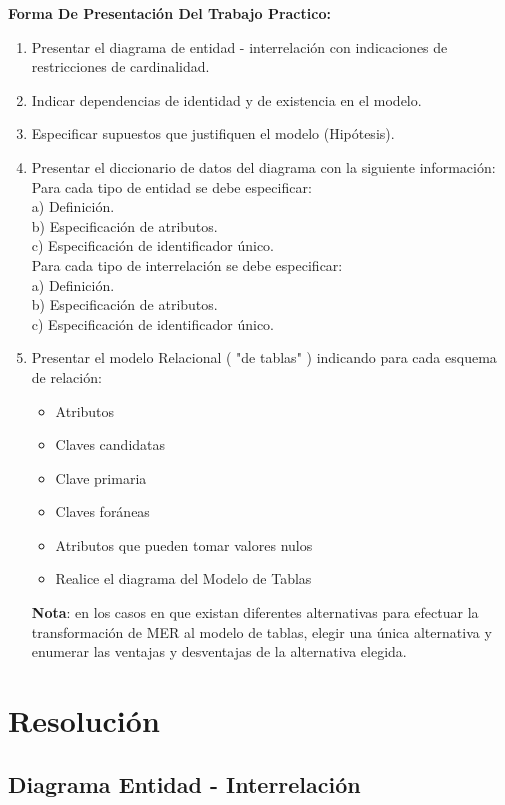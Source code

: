 \documentclass[a4paper,10pt,titlepage]{article}
\begin{document}
\textbf{Forma De Presentaci\'on Del Trabajo Practico:}
\begin{enumerate}
\item Presentar el diagrama de entidad - interrelaci\'on con indicaciones de restricciones de cardinalidad.
\item Indicar dependencias de identidad y de existencia en el modelo.
\item Especificar supuestos que justifiquen el modelo (Hip\'otesis).
\item Presentar el diccionario de datos del diagrama con la siguiente informaci\'on:\\
Para cada tipo de entidad se debe especificar:\\
a) Definici\'on.\\
b) Especificaci\'on de atributos.\\
c) Especificaci\'on de identificador \'unico.\\
Para cada tipo de interrelaci\'on se debe especificar:\\
a) Definici\'on.\\
b) Especificaci\'on de atributos.\\
c) Especificaci\'on de identificador \'unico.\\

\item Presentar el modelo Relacional ( "de tablas" ) indicando para cada esquema de relaci\'on:
\begin{itemize}
\item Atributos
\item Claves candidatas
\item Clave primaria
\item Claves for\'aneas
\item Atributos que pueden tomar valores nulos
\item Realice el diagrama del Modelo de Tablas
\end{itemize}

\textbf{Nota}: en los casos en que existan diferentes alternativas para efectuar la transformaci\'on de MER al modelo
de tablas, elegir una \'unica alternativa y enumerar las ventajas y desventajas de la alternativa elegida.

\end{enumerate}

\pagebreak
\section{Resoluci\'on}
\subsection{Diagrama Entidad - Interrelaci\'on}
\end{document}
